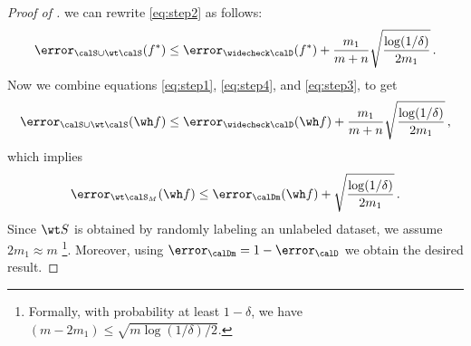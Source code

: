 \begin{proof}[Proof of ]
    we can rewrite \eqref{eq:step2} as follows: 
    \begin{align}
        \error_{\calS \cup \wt\calS}(f^*) \le \error_{ \widecheck \calD}(f^*) +  \frac{m_1}{m+n}\sqrt{\frac{\log(1/\delta)}{2 m_1}} \,. \label{eq:step4} 
    \end{align}
    Now we combine equations \eqref{eq:step1}, \eqref{eq:step4}, and \eqref{eq:step3}, to get 
    \begin{align}
        \error_{\calS \cup \wt \calS}(\wh f) \le \error_{\widecheck \calD}(\wh f) +  \frac{m_1}{m+n}\sqrt{\frac{\log(1/\delta)}{2 m_1}} \,, 
    \end{align}
    which implies 
    \begin{align}
        \error_{ \wt \calS_M}(\wh f) \le \error_{\calDm}(\wh f) + \sqrt{\frac{\log(1/\delta)}{2 m_1}} \,. \label{eq:lemma1_final}
    \end{align}
    Since $\wt S$ is obtained by randomly labeling an unlabeled dataset, we assume $2m_1 \approx m$ \footnote{Formally, with probability at least $1-\delta$, we have  $(m - 2m_1)\le \sqrt{m\log(1/\delta)/2}$.}. Moreover, using $\error_{\calDm} = 1 - \error_{\calD}$ we obtain the desired result.   
\end{proof}

